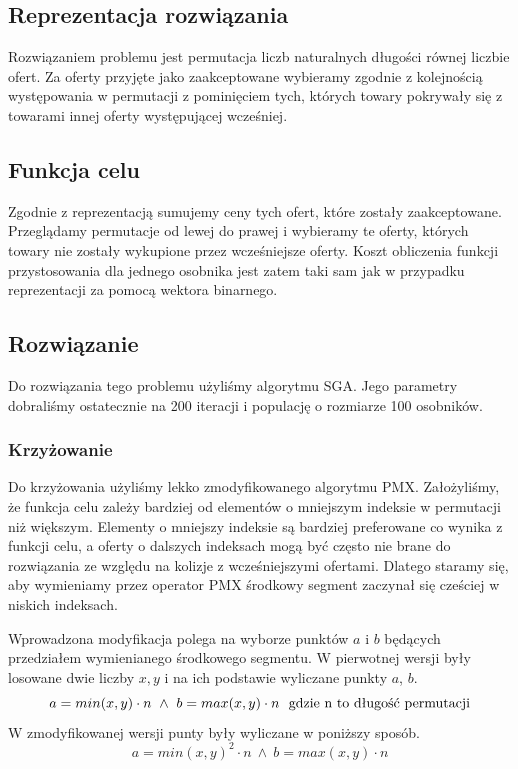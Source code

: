 \subsection{Reprezentacja rozwiązania}
Rozwiązaniem problemu jest permutacja liczb naturalnych długości równej liczbie ofert.
Za oferty przyjęte jako zaakceptowane wybieramy zgodnie z kolejnością występowania w permutacji z pominięciem tych, których towary pokrywały się z towarami innej oferty występującej wcześniej.

\subsection{Funkcja celu}
Zgodnie z reprezentacją sumujemy ceny tych ofert, które zostały zaakceptowane. Przeglądamy permutacje od lewej do prawej i wybieramy te oferty, których towary nie zostały wykupione przez wcześniejsze oferty. Koszt obliczenia funkcji przystosowania dla jednego osobnika jest zatem taki sam jak w przypadku reprezentacji za pomocą wektora binarnego.

\subsection{Rozwiązanie}
Do rozwiązania tego problemu użyliśmy algorytmu SGA.
Jego parametry dobraliśmy ostatecznie na 200 iteracji i populację o rozmiarze 100 osobników.

\subsubsection{Krzyżowanie}
Do krzyżowania użyliśmy lekko zmodyfikowanego algorytmu PMX.
Założyliśmy, że funkcja celu zależy bardziej od elementów o mniejszym indeksie w permutacji niż większym.
Elementy o mniejszy indeksie są bardziej preferowane co wynika z funkcji celu, a oferty o dalszych indeksach mogą być często nie brane do rozwiązania ze względu na kolizje z wcześniejszymi ofertami.
Dlatego staramy się, aby wymieniamy przez operator PMX środkowy segment zaczynał się cześciej w niskich indeksach.


Wprowadzona modyfikacja polega na wyborze punktów $a$ i $b$ będących przedziałem wymienianego środkowego segmentu.
W pierwotnej wersji były losowane dwie liczby $x, y$ i na ich podstawie wyliczane punkty $a$, $b$.
\begin{equation}
    a = min(x, y) \cdot n \ \wedge \ b = max(x, y) \cdot n \ \ \hbox{gdzie n to długość permutacji}
\end{equation}
W zmodyfikowanej wersji punty były wyliczane w poniższy sposób.
\begin{equation}
    a = min(x, y)^2 \cdot n \ \wedge \ b = max(x, y) \cdot n
\end{equation}

